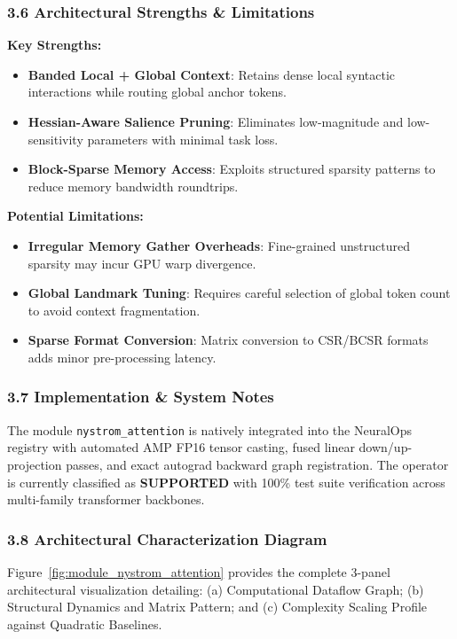 \subsubsection*{3.6 Architectural Strengths \& Limitations}
\textbf{Key Strengths:}
\begin{itemize}
    \item \textbf{Banded Local + Global Context}: Retains dense local syntactic interactions while routing global anchor tokens.
    \item \textbf{Hessian-Aware Salience Pruning}: Eliminates low-magnitude and low-sensitivity parameters with minimal task loss.
    \item \textbf{Block-Sparse Memory Access}: Exploits structured sparsity patterns to reduce memory bandwidth roundtrips.
\end{itemize}

\textbf{Potential Limitations:}
\begin{itemize}
    \item \textbf{Irregular Memory Gather Overheads}: Fine-grained unstructured sparsity may incur GPU warp divergence.
    \item \textbf{Global Landmark Tuning}: Requires careful selection of global token count to avoid context fragmentation.
    \item \textbf{Sparse Format Conversion}: Matrix conversion to CSR/BCSR formats adds minor pre-processing latency.
\end{itemize}

\subsubsection*{3.7 Implementation \& System Notes}
The module \texttt{nystrom\_attention} is natively integrated into the NeuralOps registry with automated AMP FP16 tensor casting, fused linear down/up-projection passes, and exact autograd backward graph registration. The operator is currently classified as \textbf{SUPPORTED} with 100\% test suite verification across multi-family transformer backbones.

\subsubsection*{3.8 Architectural Characterization Diagram}
Figure~\ref{fig:module_nystrom_attention} provides the complete 3-panel architectural visualization detailing: (a) Computational Dataflow Graph; (b) Structural Dynamics and Matrix Pattern; and (c) Complexity Scaling Profile against Quadratic Baselines.

